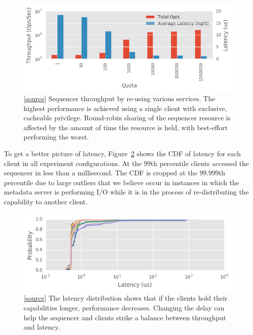 \begin{figure}[tbp]
\centering
\includegraphics{figures/tradeoff.png}
\caption{
[\href{https://github.com/michaelsevilla/malacology-popper/blob/v2.1/experiments/zlog-seqr-redux/viz.ipynb}{source}]
Sequencer throughput by re-using various services.  The highest performance is
achieved using a single client with exclusive, cacheable privilege. Round-robin
sharing of the sequencer resource is affected by the amount of time the
resource is held, with best-effort performing the worst.}
\label{fig:captp}
\end{figure}

To get a better picture of latency, Figure~\ref{fig:capcdf} shows the CDF of
latency for each client in all experiment configurations. At the 99th
percentile clients accessed the sequencer in less than a millisecond. The CDF
is cropped at the 99.999th percentile due to large outliers that we believe
occur in instances in which the metadata server is performing I/O while it is in the
process of re-distributing the capability to another client.

\begin{figure}[tbp]
\centering
\includegraphics{figures/caps-delay-latency.png}
\caption{
[\href{https://github.com/michaelsevilla/malacology-popper/blob/v2.1/experiments/zlog-seqr-redux/viz.ipynb}{source}]
The latency distribution shows that if the clients hold their capabilities
longer, performance decreases. Changing the delay can help the sequencer and
clients strike a balance between throughput and latency.}
\label{fig:capcdf}
\end{figure}

